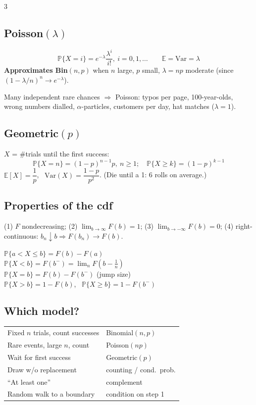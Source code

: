 \documentclass[8pt]{extarticle}
\newcommand{\PP}{\mathbb{P}}
\newcommand{\E}{\mathbb{E}}
\newcommand{\Var}{\mathrm{Var}}
\begin{document}
\begin{multicols*}{3}
\subsection{Poisson$(\lambda)$}
\[\PP\{X=i\}=e^{-\lambda}\frac{\lambda^i}{i!},\ i=0,1,\dots\qquad\E=\Var=\lambda\]
\textbf{Approximates Bin$(n,p)$} when $n$ large, $p$ small, $\lambda=np$ moderate (since $(1-\lambda/n)^n\to e^{-\lambda}$).
\begin{idea}Many independent rare chances $\Rightarrow$ Poisson: typos per page, 100-year-olds, wrong numbers dialled, $\alpha$-particles, customers per day, hat matches ($\lambda=1$).\end{idea}

\subsection{Geometric$(p)$}
$X$ = \#trials until the first success:
\[\PP\{X=n\}=(1-p)^{n-1}p,\ n\ge1;\quad \PP\{X\ge k\}=(1-p)^{k-1}\]
$\E[X]=\dfrac1p$, \ $\Var(X)=\dfrac{1-p}{p^2}$. (Die until a 1: 6 rolls on average.)

\subsection{Properties of the cdf}
(1) $F$ nondecreasing; (2) $\lim_{b\to\infty}F(b)=1$; (3) $\lim_{b\to-\infty}F(b)=0$; (4) right-continuous: $b_n\downarrow b\Rightarrow F(b_n)\to F(b)$.
\begin{key}
$\PP\{a<X\le b\}=F(b)-F(a)$\\
$\PP\{X<b\}=F(b^-)=\lim_{n}F(b-\tfrac1n)$\\
$\PP\{X=b\}=F(b)-F(b^-)$ (jump size)\\
$\PP\{X>b\}=1-F(b)$, \ $\PP\{X\ge b\}=1-F(b^-)$
\end{key}

\subsection{Which model?}
\begin{tabular}{@{}l@{\ }l@{}}
Fixed $n$ trials, count successes & Binomial$(n,p)$\\
Rare events, large $n$, count & Poisson$(np)$\\
Wait for first success & Geometric$(p)$\\
Draw w/o replacement & counting / cond.\ prob.\\
``At least one'' & complement\\
Random walk to a boundary & condition on step 1
\end{tabular}


\end{multicols*}
\end{document}
